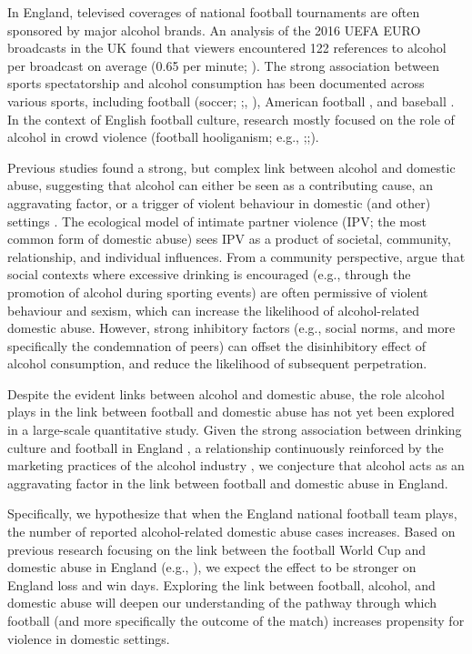 \documentclass[12pt, a4paper]{article}
\begin{document}
In England, televised coverages of national football tournaments are often sponsored by major alcohol brands. An analysis of the 2016 UEFA EURO broadcasts in the UK found that viewers encountered 122 references to alcohol per broadcast on average (0.65 per minute; ). The strong association between sports spectatorship and alcohol consumption has been documented across various sports, including football (soccer; ;, ), American football \cite{Glassman2011}, and baseball \cite{Erickson2011}. In the context of English football culture, research mostly focused on the role of alcohol in crowd violence (football hooliganism; e.g., ;;). 

Previous studies found a strong, but complex link between alcohol and domestic abuse, suggesting that alcohol can either be seen as a contributing cause, an aggravating factor, or a trigger of violent behaviour in domestic (and other) settings \cite{Leonard2017}. The ecological model of intimate partner violence (IPV; the most common form of domestic abuse) sees IPV as a product of societal, community, relationship, and individual influences. From a community perspective,  argue that social contexts where excessive drinking is encouraged (e.g., through the promotion of alcohol during sporting events) are often permissive of violent behaviour and sexism, which can increase the likelihood of alcohol-related domestic abuse. However, strong inhibitory factors (e.g., social norms, and more specifically the condemnation of peers) can offset the disinhibitory effect of alcohol consumption, and reduce the likelihood of subsequent perpetration.  



Despite the evident links between alcohol and domestic abuse, the role alcohol plays in the link between football and domestic abuse has not yet been explored in a large-scale quantitative study. Given the strong association between drinking culture and football in England \cite{Dixon2014}, a relationship continuously reinforced by the marketing practices of the alcohol industry \cite{Gornall2014}, we conjecture that alcohol acts as an aggravating factor in the link between football and domestic abuse in England. 

Specifically, we hypothesize that when the England national football team plays, the number of reported alcohol-related domestic abuse cases increases. Based on previous research focusing on the link between the football World Cup and domestic abuse in England (e.g., ), we expect the effect to be stronger on England loss and win days. Exploring the link between football, alcohol, and domestic abuse will deepen our understanding of the pathway through which football (and more specifically the outcome of the match) increases propensity for violence in domestic settings.
\end{document}
